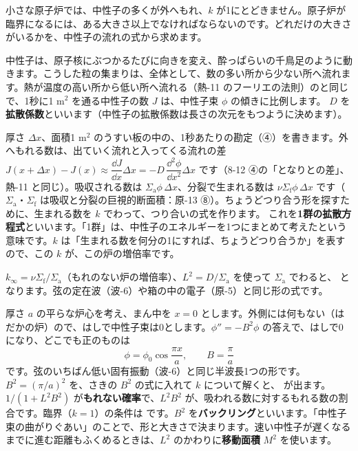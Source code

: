 \phkokomade


\label{ph:原-15:sec7}
小さな原子炉では、中性子の多くが外へもれ、$k$ が1にとどきません。原子炉が臨界になるには、ある大きさ以上でなければならないのです。どれだけの大きさがいるかを、中性子の流れの式から求めます。

中性子は、原子核にぶつかるたびに向きを変え、酔っぱらいの千鳥足のように動きます。こうした粒の集まりは、全体として、数の多い所から少ない所へ流れます。熱が温度の高い所から低い所へ流れる（熱-11 のフーリエの法則）のと同じで、1秒に1 m$^2$ を通る中性子の数 $J$ は、中性子束 $\phi$ の傾きに比例します。
$D$ を\textbf{拡散係数}といいます（中性子の拡散係数は長さの次元をもつように決めます）。

厚さ $\Delta x$、面積1 m$^2$ のうすい板の中の、1秒あたりの勘定（④）を書きます。外へもれる数は、出ていく流れと入ってくる流れの差 $J(x+\Delta x)-J(x)\approx\dfrac{\dd J}{\dd x}\Delta x=-D\,\dfrac{\dd^2\phi}{\dd x^2}\Delta x$ です（8-12 ④の「となりとの差」、熱-11 と同じ）。吸収される数は $\Sigma_{\mathrm a}\phi\,\Delta x$、分裂で生まれる数は $\nu\Sigma_{\mathrm f}\phi\,\Delta x$ です（$\Sigma_{\mathrm a}$・$\Sigma_{\mathrm f}$ は吸収と分裂の巨視的断面積：原-13 ⑧）。ちょうどつり合う形を探すために、生まれる数を $k$ でわって、つり合いの式を作ります。
\label{ph:原-15:diffusion}これを\textbf{1群の拡散方程式}といいます。「1群」は、中性子のエネルギーを1つにまとめて考えたという意味です。$k$ は「生まれる数を何分の1にすれば、ちょうどつり合うか」を表すので、この $k$ が、この炉の増倍率です。

$k_\infty=\nu\Sigma_{\mathrm f}/\Sigma_{\mathrm a}$（もれのない炉の増倍率）、$L^2=D/\Sigma_{\mathrm a}$ を使って $\Sigma_{\mathrm a}$ でわると、
となります。弦の定在波（波-6）や箱の中の電子（原-5）と同じ形の式です。

厚さ $a$ の平らな炉心を考え、まん中を $x=0$ とします。外側には何もない（はだかの炉）ので、はしで中性子束は0とします。$\phi''=-B^2\phi$ の答えで、はしで0になり、どこでも正のものは
\[ \phi=\phi_0\cos\frac{\pi x}{a},\qquad B=\frac{\pi}{a} \]
です。弦のいちばん低い固有振動（波-6）と同じ半波長1つの形です。$B^2=(\pi/a)^2$ を、さきの $B^2$ の式に入れて $k$ について解くと、
\label{ph:原-15:keff}が出ます。$1/(1+L^2B^2)$ が\textbf{もれない確率}で、$L^2B^2$ が、吸われる数に対するもれる数の割合です。臨界（$k=1$）の条件は
です。$B^2$ を\textbf{バックリング}といいます。「中性子束の曲がりぐあい」のことで、形と大きさで決まります。速い中性子が遅くなるまでに進む距離もふくめるときは、$L^2$ のかわりに\textbf{移動面積} $M^2$ を使います。

